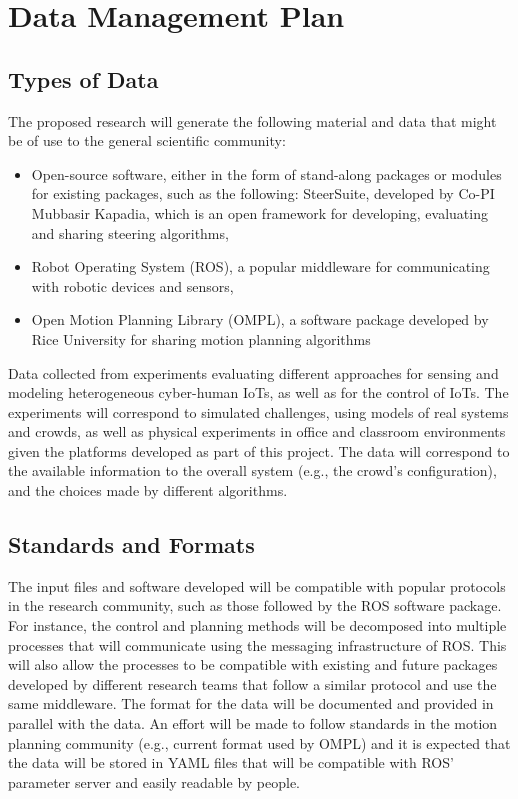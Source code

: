 \section{Data Management Plan}

\subsection{Types of Data} 
The proposed research will generate the following material and data that might be of use to the general scientific community: 
\begin{itemize}
\item Open-source software, either in the form of stand-along packages or modules for existing packages, such as the following: 
	SteerSuite, developed by Co-PI Mubbasir Kapadia, which is an open framework for developing, evaluating and sharing steering algorithms,
\item Robot Operating System (ROS), a popular middleware for communicating with robotic devices and sensors, 
\item Open Motion Planning Library (OMPL), a software package developed by Rice University for sharing motion planning algorithms 
\end{itemize}

Data collected from experiments evaluating different approaches for sensing and modeling heterogeneous cyber-human IoTs, as well as for the control of IoTs. The experiments will correspond to simulated challenges, using models of real systems and crowds, as well as physical experiments in office and classroom environments given the platforms developed as part of this project. The data will correspond to the available information to the overall system (e.g., the crowd’s configuration), and the choices made by different algorithms. 

\subsection{Standards and Formats} 
The input files and software developed will be compatible with popular protocols in the research community, such as those followed by the ROS software package. For instance, the control and planning methods will be decomposed into multiple processes that will communicate using the messaging infrastructure of ROS. This will also allow the processes to be compatible with existing and future packages developed by different research teams that follow a similar protocol and use the same middleware. 
The format for the data will be documented and provided in parallel with the data. An effort will be made to follow standards in the motion planning community (e.g., current format used by OMPL) and it is expected that the data will be stored in YAML files that will be compatible with ROS’ parameter server and easily readable by people. 

